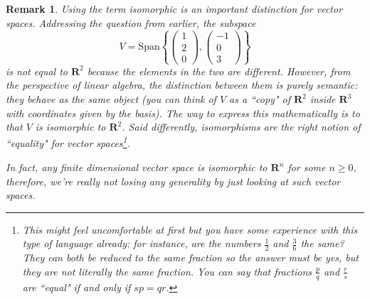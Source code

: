 \documentclass[12pt]{article}
\numberwithin{equation}{subsection}
\numberwithin{figure}{subsection}
\theoremstyle{note}
\newtheorem{remark}[subsection]{Remark}
\newcommand\Span[1]{\mathrm{Span}\left\{#1\right\}}
\begin{document}
\begin{remark}
	Using the term \textit{isomorphic} is an important distinction for vector spaces. Addressing the question from earlier, the subspace \[V=\Span{ \begin{pmatrix} 1 \\ 2 \\ 0 \end{pmatrix}, \begin{pmatrix} -1 \\ 0 \\ 3\end{pmatrix}}\] is not \textit{equal} to $\mathbf{R}^2$ because the elements in the two are different. However, from the perspective of linear algebra, the distinction between them is purely semantic: they behave as the same object (you can think of $V$ as a ``copy" of $\mathbf{R}^2$ inside $\mathbf{R}^3$ with coordinates given by the basis). The way to express this mathematically is to that $V$ is isomorphic to $\mathbf{R}^2$. Said differently, isomorphisms are the right notion of ``equality" for vector spaces\footnote{This might feel uncomfortable at first but you have some experience with this type of language already: for instance, are the numbers $\frac{1}{2}$ and $\frac{3}{6}$ the same? They can both be reduced to the same fraction so the answer must be yes, but they are not literally the same fraction. You can say that fractions $\frac{p}{q}$ and $\frac{r}{s}$ are ``equal" if and only if $sp=qr$.}. 
	
	In fact, any finite dimensional vector space is  isomorphic to $\mathbf{R}^n$ for some $n\geq 0$, therefore, we're really not losing any generality by just looking at such vector spaces. 
\end{remark}
\end{document}
